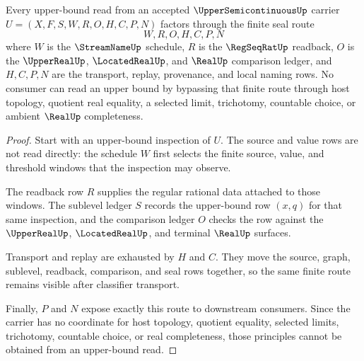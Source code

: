 \begin{theorem}
\label{thm:uppersemicontinuous-finite-window-stability}
Every upper-bound read from an accepted $\UpperSemicontinuousUp$ carrier
$U=(X,F,S,W,R,O,H,C,P,N)$ factors through the finite seal route
$$
W,R,O,H,C,P,N
$$
where $W$ is the $\StreamNameUp$ schedule, $R$ is the $\RegSeqRatUp$
readback, $O$ is the $\UpperRealUp$, $\LocatedRealUp$, and $\RealUp$
comparison ledger, and $H,C,P,N$ are the transport, replay, provenance, and
local naming rows. No consumer can read an upper bound by bypassing that
finite route through host topology, quotient real equality, a selected limit,
trichotomy, countable choice, or ambient $\RealUp$ completeness.
\end{theorem}
\begin{proof}
Start with an upper-bound inspection of $U$. The source and value rows are
not read directly: the schedule $W$ first selects the finite source, value,
and threshold windows that the inspection may observe.

The readback row $R$ supplies the regular rational data attached to those
windows. The sublevel ledger $S$ records the upper-bound row $(x,q)$ for that
same inspection, and the comparison ledger $O$ checks the row against the
$\UpperRealUp$, $\LocatedRealUp$, and terminal $\RealUp$ surfaces.

Transport and replay are exhausted by $H$ and $C$. They move the source,
graph, sublevel, readback, comparison, and seal rows together, so the same
finite route remains visible after classifier transport.

Finally, $P$ and $N$ expose exactly this route to downstream consumers. Since
the carrier has no coordinate for host topology, quotient equality, selected
limits, trichotomy, countable choice, or real completeness, those principles
cannot be obtained from an upper-bound read.
\end{proof}

